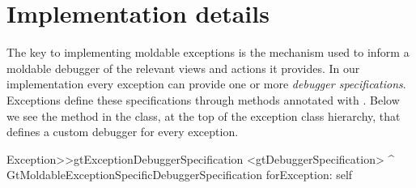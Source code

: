 \documentclass[sigplan,anonymous,review,10pt]{acmart}
\begin{document}
%
%

\section{Implementation details}\label{sec:implementation}


The key to implementing moldable exceptions is the mechanism used to inform a moldable debugger of the relevant views and actions it provides.
In our implementation every exception can provide one or more \emph{debugger specifications}.
Exceptions define these specifications through methods annotated with .
Below we see the method in the  class, at the top of the exception class hierarchy, that defines a custom debugger for every exception.

\begin{code}
Exception>>gtExceptionDebuggerSpecification
	<gtDebuggerSpecification>
	^ GtMoldableExceptionSpecificDebuggerSpecification
		forException: self
\end{code}
\end{document}
